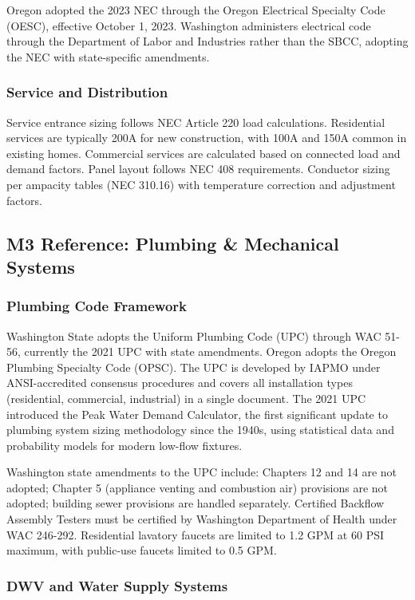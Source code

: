 \documentclass[11pt,letterpaper]{article}
\begin{document}
Oregon adopted the 2023 NEC through the Oregon Electrical Specialty Code (OESC), effective October 1, 2023. Washington administers electrical code through the Department of Labor and Industries rather than the SBCC, adopting the NEC with state-specific amendments.

\subsubsection{Service and Distribution}

Service entrance sizing follows NEC Article 220 load calculations. Residential services are typically 200A for new construction, with 100A and 150A common in existing homes. Commercial services are calculated based on connected load and demand factors. Panel layout follows NEC 408 requirements. Conductor sizing per ampacity tables (NEC 310.16) with temperature correction and adjustment factors.

\subsection{M3 Reference: Plumbing \& Mechanical Systems}

\subsubsection{Plumbing Code Framework}

Washington State adopts the Uniform Plumbing Code (UPC) through WAC 51-56, currently the 2021 UPC with state amendments. Oregon adopts the Oregon Plumbing Specialty Code (OPSC). The UPC is developed by IAPMO under ANSI-accredited consensus procedures and covers all installation types (residential, commercial, industrial) in a single document. The 2021 UPC introduced the Peak Water Demand Calculator, the first significant update to plumbing system sizing methodology since the 1940s, using statistical data and probability models for modern low-flow fixtures.

Washington state amendments to the UPC include: Chapters 12 and 14 are not adopted; Chapter 5 (appliance venting and combustion air) provisions are not adopted; building sewer provisions are handled separately. Certified Backflow Assembly Testers must be certified by Washington Department of Health under WAC 246-292. Residential lavatory faucets are limited to 1.2 GPM at 60 PSI maximum, with public-use faucets limited to 0.5 GPM.

\subsubsection{DWV and Water Supply Systems}
\end{document}
